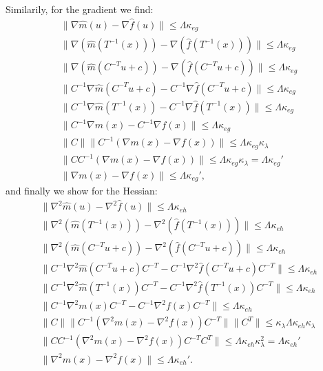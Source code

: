 Similarily, for the gradient we find:
\begin{align*}
\|\nabla \hat m(u) - \nabla \hat f(u)\| \le \Lambda \kappa_{eg} \\
\|\nabla (\hat m(T^{-1}(x))) - \nabla (\hat f(T^{-1}(x)))\| \le \Lambda \kappa_{eg} \\
\|\nabla (\hat m(C^{-T}u + c)) - \nabla (\hat f(C^{-T}u + c))\| \le \Lambda \kappa_{eg} \\
\|C^{-1} \nabla \hat m(C^{-T}u + c) - C^{-1} \nabla \hat f(C^{-T}u + c)\| \le \Lambda \kappa_{eg} \\
\|C^{-1} \nabla \hat m(T^{-1}(x)) - C^{-1} \nabla \hat f(T^{-1}(x))\| \le \Lambda \kappa_{eg} \\
\|C^{-1} \nabla m(x) - C^{-1} \nabla f(x)\| \le \Lambda \kappa_{eg} \\
\|C\| \|C^{-1} (\nabla m(x) - \nabla f(x))\| \le {\Lambda \kappa_{eg}}{\kappa_{\lambda}} \\
\|CC^{-1} (\nabla m(x) - \nabla f(x))\| \le {\Lambda \kappa_{eg}}{\kappa_{\lambda}} = \Lambda \kappa_{eg}'\\
\|\nabla m(x) - \nabla f(x)\| \le \Lambda \kappa_{eg}',
\end{align*}
and finally we show for the Hessian:
\begin{align*}
\|\nabla^2 \hat m(u) - \nabla^2 \hat f(u)\| \le \Lambda \kappa_{eh} \\
\|\nabla^2 (\hat m(T^{-1}(x))) - \nabla^2 (\hat f(T^{-1}(x)))\| \le \Lambda \kappa_{eh} \\
\|\nabla^2 (\hat m(C^{-T}u + c)) - \nabla^2 (\hat f(C^{-T}u + c))\| \le \Lambda \kappa_{eh} \\
\|C^{-1} \nabla^2 \hat m(C^{-T}u + c) C^{-T} - C^{-1} \nabla^2 \hat f(C^{-T}u + c) C^{-T}\| \le \Lambda \kappa_{eh} \\
\|C^{-1} \nabla^2 \hat m(T^{-1}(x)) C^{-T} - C^{-1} \nabla^2 \hat f(T^{-1}(x)) C^{-T}\| \le \Lambda \kappa_{eh} \\
\|C^{-1} \nabla^2 m(x) C^{-T} - C^{-1} \nabla^2 f(x) C^{-T}\| \le \Lambda \kappa_{eh} \\
\|C\| \|C^{-1} (\nabla^2 m(x) - \nabla^2 f(x)) C^{-T}\| \|C^T\| \le \kappa_{\lambda}{\Lambda \kappa_{eh}}{\kappa_{\lambda}} \\
\|CC^{-1} (\nabla^2 m(x) - \nabla^2 f(x)) C^{-T}C^T\| \le {\Lambda \kappa_{eh}}{\kappa_{\lambda}^2} = \Lambda \kappa_{eh}' \\
\|\nabla^2 m(x) - \nabla^2 f(x)\| \le \Lambda \kappa_{eh}'.
\end{align*}

